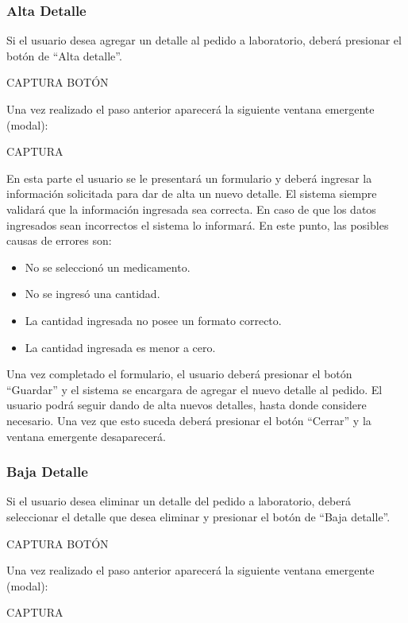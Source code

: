 \documentclass[letterpaper,10pt,spanish]{sphinxmanual}
\begin{document}
\subsubsection{Alta Detalle}
\label{pedidosalab:alta-detalle}
Si el usuario desea agregar un detalle al pedido a laboratorio, deberá presionar el botón de “Alta detalle”.

CAPTURA BOTÓN

Una vez realizado el paso anterior aparecerá la siguiente ventana emergente (modal):

CAPTURA

En esta parte el usuario se le presentará un formulario y deberá ingresar la información solicitada para dar de alta un nuevo detalle.
El sistema siempre validará que la información ingresada sea correcta. En caso de que los datos ingresados sean incorrectos el sistema lo informará.
En este punto, las posibles causas de errores son:
\begin{itemize}
\item {} 
No se seleccionó un medicamento.

\item {} 
No se ingresó una cantidad.

\item {} 
La cantidad ingresada no posee un formato correcto.

\item {} 
La cantidad ingresada es menor a cero.

\end{itemize}

Una vez completado el formulario, el usuario deberá presionar el botón “Guardar” y el sistema se encargara de agregar el nuevo detalle al pedido.
El usuario podrá seguir dando de alta nuevos detalles, hasta donde considere necesario. Una vez que esto suceda deberá presionar el botón “Cerrar” y la ventana emergente desaparecerá.


\subsubsection{Baja Detalle}
\label{pedidosalab:baja-detalle}
Si el usuario desea eliminar un detalle del pedido a laboratorio, deberá seleccionar el detalle que desea eliminar y presionar el botón de “Baja detalle”.

CAPTURA BOTÓN

Una vez realizado el paso anterior aparecerá la siguiente ventana emergente (modal):

CAPTURA
\end{document}
